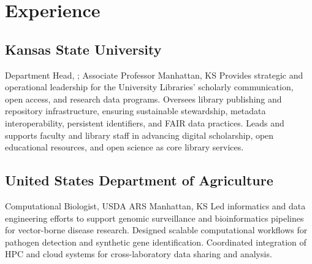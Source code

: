 {\large\CandidateName\par}
\ExampleNote

\section{Experience}

\subsection{Kansas State University}
  {Department Head, ; Associate Professor}
  {}
  {Manhattan, KS}{}%
  {
Provides strategic and operational leadership for the University Libraries’ scholarly communication, open access, and research data programs. Oversees library publishing and repository infrastructure, ensuring sustainable stewardship, metadata interoperability, persistent identifiers, and FAIR data practices. Leads and supports faculty and library staff in advancing digital scholarship, open educational resources, and open science as core library services.
  }

\subsection{United States Department of Agriculture}
  {Computational Biologist, }
  {USDA ARS}
  {Manhattan, KS}{}%
  {
  Led informatics and data engineering efforts to support genomic surveillance and bioinformatics pipelines for vector-borne disease research. Designed scalable computational workflows for pathogen detection and synthetic gene identification. Coordinated integration of HPC and cloud systems for cross-laboratory data sharing and analysis.
  }

